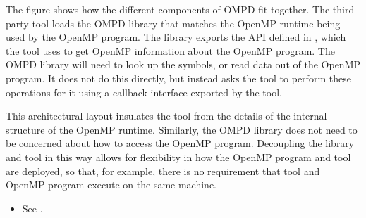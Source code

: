 The figure shows how the different components of OMPD fit together. The third-party tool loads
the OMPD library
that matches the OpenMP runtime being used by the OpenMP program. The
library exports the API defined in
, which the tool uses to get
OpenMP information about the
OpenMP program. The OMPD
library will need to look up the symbols, or read data out of the
OpenMP program. It does not do this directly,
but instead asks the tool to perform these operations
for it using a callback interface exported
by the tool.

This architectural layout insulates the tool from the details of the
internal structure of the
OpenMP runtime. Similarly, the OMPD library does not need to be
concerned about how to access
the OpenMP program. Decoupling the library and tool in this
way allows for flexibility in how the OpenMP program and tool are deployed, so that, for example,
there is no requirement that tool and OpenMP program
execute on the same machine.

\crossreferences
\begin{itemize}
\item See .
\end{itemize}

